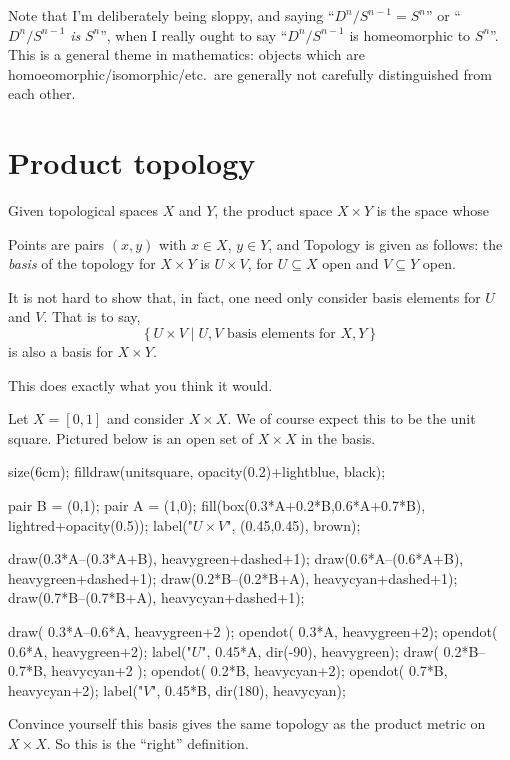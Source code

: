 \begin{abuse}
	Note that I'm deliberately being sloppy, and saying
	``$D^n / S^{n-1} = S^n$'' or ``$D^n / S^{n-1}$ \emph{is} $S^n$'',
	when I really ought to say ``$D^n / S^{n-1}$ is homeomorphic to $S^n$''.
	This is a general theme in mathematics:
	objects which are homoeomorphic/isomorphic/etc.\ are generally
	not carefully distinguished from each other.
\end{abuse}

\section{Product topology}

\begin{definition}
	Given topological spaces $X$ and $Y$,
	the product space $X \times Y$ is the space whose
	\begin{itemize}
		\ii Points are pairs $(x,y)$ with $x \in X$, $y \in Y$, and
		\ii Topology is given as follows: the \emph{basis} of
		the topology for $X \times Y$ is $U \times V$,
		for $U \subseteq X$ open and $V \subseteq Y$ open.
	\end{itemize}
\end{definition}
\begin{remark}
	It is not hard to show that, in fact,
	one need only consider basis elements for $U$ and $V$.
	That is to say,
	\[ \left\{ U \times V \mid
		U,V \text{ basis elements for } X,Y \right\} \]
	is also a basis for $X \times Y$.
\end{remark}

This does exactly what you think it would.
\begin{example}
	Let $X = [0,1]$ and consider $X \times X$.
	We of course expect this to be the unit square.
	Pictured below is an open set of $X \times X$ in the basis.
	\begin{center}
		\begin{asy}
		size(6cm);
		filldraw(unitsquare, opacity(0.2)+lightblue, black);

		pair B = (0,1);
		pair A = (1,0);
		fill(box(0.3*A+0.2*B,0.6*A+0.7*B), lightred+opacity(0.5));
		label("$U \times V$", (0.45,0.45), brown);

		draw(0.3*A--(0.3*A+B), heavygreen+dashed+1);
		draw(0.6*A--(0.6*A+B), heavygreen+dashed+1);
		draw(0.2*B--(0.2*B+A), heavycyan+dashed+1);
		draw(0.7*B--(0.7*B+A), heavycyan+dashed+1);

		draw( 0.3*A--0.6*A, heavygreen+2 );
		opendot( 0.3*A,  heavygreen+2);
		opendot( 0.6*A, heavygreen+2);
		label("$U$", 0.45*A, dir(-90), heavygreen);
		draw( 0.2*B--0.7*B, heavycyan+2 );
		opendot( 0.2*B, heavycyan+2);
		opendot( 0.7*B, heavycyan+2);
		label("$V$", 0.45*B, dir(180), heavycyan);
		\end{asy}
	\end{center}
\end{example}
\begin{exercise}
	Convince yourself this basis gives the same topology
	as the product metric on $X \times X$.
	So this is the ``right'' definition.
\end{exercise}

